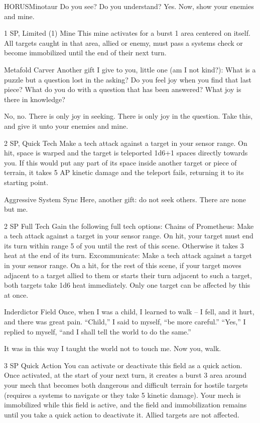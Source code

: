 \begin{mech}{HORUS}{Minotaur}
Do you see? Do you understand? Yes. Now, show your enemies and mine.

1 SP, Limited (1)
Mine
This mine activates for a burst 1 area centered on itself. All targets caught in that area, allied or enemy, must pass a systems check or become immobilized until the end of their next turn.

Metafold Carver
Another gift I give to you, little one (am I not kind?): What is a puzzle but a question lost in the asking? Do you feel joy when you find that last piece? What do you do with a question that has been answered? What joy is there in knowledge?

No, no. There is only joy in seeking. There is only joy in the question. Take this, and give it unto your enemies and mine.

2 SP, Quick Tech
Make a tech attack against a target in your sensor range. On hit, space is warped and the target is teleported 1d6+1 spaces directly towards you. If this would put any part of its space inside another target or piece of terrain, it takes 5 AP kinetic damage and the teleport fails, returning it to its starting point.

Aggressive System Sync
Here, another gift: do not seek others. There are none but me.

2 SP
Full Tech
Gain the following full tech options:
Chains of Prometheus: Make a tech attack against a target in your sensor range. On hit, your target must end its turn within range 5 of you until the rest of this scene. Otherwise it takes 3 heat at the end of its turn.
Excommunicate: Make a tech attack against a target in your sensor range. On a hit, for the rest of this scene, if your target moves adjacent to a target allied to them or starts their turn adjacent to such a target, both targets take 1d6 heat immediately. Only one target can be affected by this at once.

Inderdictor Field
Once, when I was a child, I learned to walk  -- I fell, and it hurt, and there was great pain. ``Child,'' I said to myself, ``be more careful.'' ``Yes,'' I replied to myself, ``and I shall tell the world to do the same.''

It was in this way I taught the world not to touch me. Now you, walk.

3 SP
Quick Action
You can activate or deactivate this field as a quick action. Once activated, at the start of your next turn, it creates a burst 3 area around your mech that becomes both dangerous and difficult terrain for hostile targets (requires a systems to navigate or they take 5 kinetic damage). Your mech is immobilized while this field is active, and the field and immobilization remains until you take a quick action to deactivate it. Allied targets are not affected.


\end{mech}
